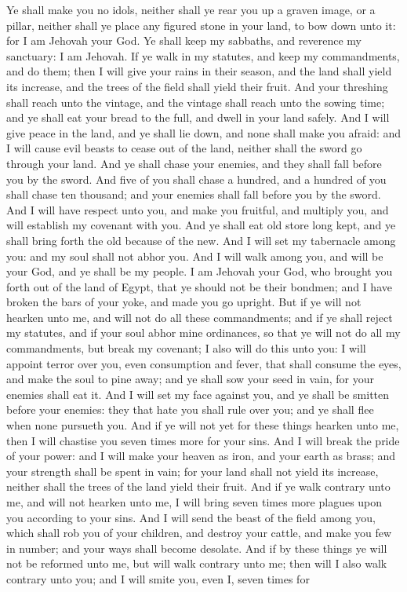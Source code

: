 Ye shall make you no idols, neither shall ye rear you up a graven image, or a pillar, neither shall ye place any figured stone in your land, to bow down unto it: for I am Jehovah your God. Ye shall keep my sabbaths, and reverence my sanctuary: I am Jehovah.  If ye walk in my statutes, and keep my commandments, and do them; then I will give your rains in their season, and the land shall yield its increase, and the trees of the field shall yield their fruit. And your threshing shall reach unto the vintage, and the vintage shall reach unto the sowing time; and ye shall eat your bread to the full, and dwell in your land safely. And I will give peace in the land, and ye shall lie down, and none shall make you afraid: and I will cause evil beasts to cease out of the land, neither shall the sword go through your land. And ye shall chase your enemies, and they shall fall before you by the sword. And five of you shall chase a hundred, and a hundred of you shall chase ten thousand; and your enemies shall fall before you by the sword. And I will have respect unto you, and make you fruitful, and multiply you, and will establish my covenant with you. And ye shall eat old store long kept, and ye shall bring forth the old because of the new. And I will set my tabernacle among you: and my soul shall not abhor you. And I will walk among you, and will be your God, and ye shall be my people. I am Jehovah your God, who brought you forth out of the land of Egypt, that ye should not be their bondmen; and I have broken the bars of your yoke, and made you go upright.  But if ye will not hearken unto me, and will not do all these commandments; and if ye shall reject my statutes, and if your soul abhor mine ordinances, so that ye will not do all my commandments, but break my covenant; I also will do this unto you: I will appoint terror over you, even consumption and fever, that shall consume the eyes, and make the soul to pine away; and ye shall sow your seed in vain, for your enemies shall eat it. And I will set my face against you, and ye shall be smitten before your enemies: they that hate you shall rule over you; and ye shall flee when none pursueth you. And if ye will not yet for these things hearken unto me, then I will chastise you seven times more for your sins. And I will break the pride of your power: and I will make your heaven as iron, and your earth as brass; and your strength shall be spent in vain; for your land shall not yield its increase, neither shall the trees of the land yield their fruit.  And if ye walk contrary unto me, and will not hearken unto me, I will bring seven times more plagues upon you according to your sins. And I will send the beast of the field among you, which shall rob you of your children, and destroy your cattle, and make you few in number; and your ways shall become desolate.  And if by these things ye will not be reformed unto me, but will walk contrary unto me; then will I also walk contrary unto you; and I will smite you, even I, seven times for 